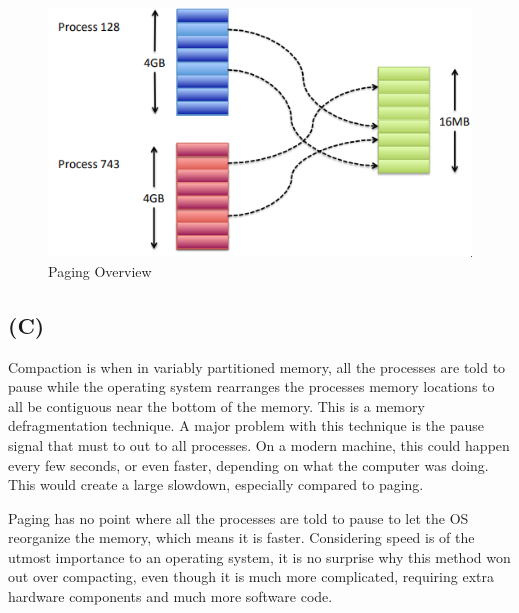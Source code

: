 \documentclass[12pt]{article}
\begin{document}
	
	\begin{figure}
		\centering
		\includegraphics[width=\columnwidth]{paging-overview}
		\caption{Paging Overview}
		\label{paging-overview}
	\end{figure}
	
	
	\subsection*{(C)}
	Compaction is when in variably partitioned memory, all the processes are told to pause while the operating system rearranges the processes memory locations to all be contiguous near the bottom of the memory. This is a memory defragmentation technique. A major problem with this technique is the pause signal that must to out to all processes. On a modern machine, this could happen every few seconds, or even faster, depending on what the computer was doing. This would create a large slowdown, especially compared to paging.
	
	Paging has no point where all the processes are told to pause to let the OS reorganize the memory, which means it is faster. Considering speed is of the utmost importance to an operating system, it is no surprise why this method won out over compacting, even though it is much more complicated, requiring extra hardware components and much more software code.
	
\end{document}
